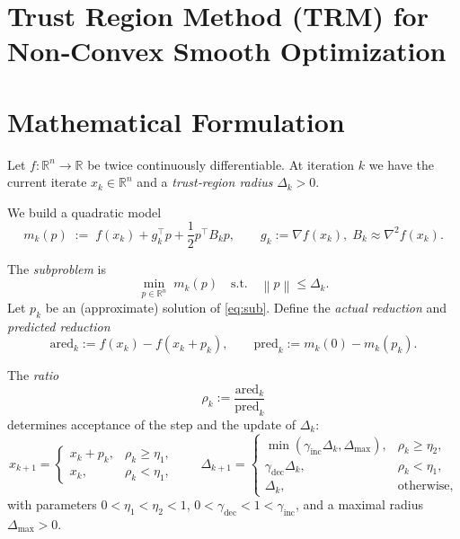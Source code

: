\documentclass{article}
\newcommand{\norm}[1]{\left\lVert#1\right\rVert}
\newcommand{\RR}{\mathbb{R}}
\begin{document}
\section*{Trust Region Method (TRM) for Non‑Convex Smooth Optimization}

\section*{Mathematical Formulation}
Let $f:\RR^{n}\rightarrow\RR$ be twice continuously differentiable.  
At iteration $k$ we have the current iterate $x_k\in\RR^{n}$ and a \emph{trust‑region radius} $\Delta_k>0$.  

We build a quadratic model
\[
m_k(p)\;:=\;f(x_k)+g_k^{\top}p+\frac12 p^{\top}B_k p,
\qquad 
g_k:=\nabla f(x_k),\; B_k\approx \nabla^{2}f(x_k).
\]

The \emph{subproblem} is
\begin{equation}
\label{eq:sub}
\min_{p\in\RR^{n}}\;m_k(p)\quad\text{s.t.}\quad \norm{p}\le \Delta_k .
\end{equation}
Let $p_k$ be an (approximate) solution of \eqref{eq:sub}.  
Define the \emph{actual reduction} and \emph{predicted reduction}
\[
\text{ared}_k:=f(x_k)-f(x_k+p_k),\qquad
\text{pred}_k:=m_k(0)-m_k(p_k).
\]

The \emph{ratio}
\begin{equation}
\rho_k:=\frac{\text{ared}_k}{\text{pred}_k}
\end{equation}
determines acceptance of the step and the update of $\Delta_k$:
\[
x_{k+1}= 
\begin{cases}
x_k+p_k, & \rho_k\ge\eta_1,\\[4pt]
x_k,    & \rho_k<\eta_1,
\end{cases}
\qquad
\Delta_{k+1}= 
\begin{cases}
\min(\gamma_{\text{inc}}\Delta_k,\Delta_{\max}), & \rho_k\ge\eta_2,\\[4pt]
\gamma_{\text{dec}}\Delta_k,                   & \rho_k<\eta_1,\\[4pt]
\Delta_k,                                      & \text{otherwise},
\end{cases}
\]
with parameters $0<\eta_1<\eta_2<1$, $0<\gamma_{\text{dec}}<1<\gamma_{\text{inc}}$, and a maximal radius $\Delta_{\max}>0$.
\end{document}
